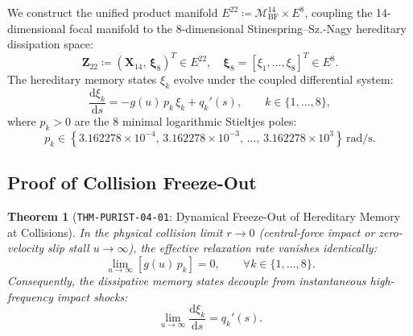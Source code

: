 \documentclass[11pt,a4paper,reqno]{article}
\theoremstyle{plain}
\newtheorem{theorem}{Theorem}[section]
\theoremstyle{definition}
\theoremstyle{remark}
\numberwithin{equation}{section}
\begin{document}
We construct the unified product manifold $E^{22} \coloneqq \mathcal{M}_{\mathrm{BF}}^{14} \times E^8$, coupling the 14-dimensional focal manifold to the 8-dimensional Stinespring--Sz.-Nagy hereditary dissipation space:
\begin{equation}
  \bm{Z}_{22} \coloneqq (\bm{X}_{14}, \, \bm{\xi}_8)^T \in E^{22}, \quad \bm{\xi}_8 = [\xi_1, \dots, \xi_8]^T \in E^8.
\end{equation}
The hereditary memory states $\xi_k$ evolve under the coupled differential system:
\begin{equation}
  \frac{\mathrm{d}\xi_k}{\mathrm{d}s} = - g(u) \, p_k \, \xi_k + q_k'(s), \qquad k \in \{1, \dots, 8\},
  \label{eq:coupled_xi}
\end{equation}
where $p_k > 0$ are the 8 minimal logarithmic Stieltjes poles:
\begin{equation}
  p_k \in \left\{ 3.162278 \times 10^{-4}, \, 3.162278 \times 10^{-3}, \, \dots, \, 3.162278 \times 10^3 \right\} \,\mathrm{rad/s}.
\end{equation}

\subsection{Proof of Collision Freeze-Out}
\begin{theorem}[\texttt{THM-PURIST-04-01}: Dynamical Freeze-Out of Hereditary Memory at Collisions]
\label{thm:collision_freeze_out}
In the physical collision limit $r \to 0$ (central-force impact or zero-velocity slip stall $u \to \infty$), the effective relaxation rate vanishes identically:
\begin{equation}
  \lim_{u \to \infty} \left[ g(u) \, p_k \right] = 0, \qquad \forall k \in \{1, \dots, 8\}.
\end{equation}
Consequently, the dissipative memory states decouple from instantaneous high-frequency impact shocks:
\begin{equation}
  \lim_{u \to \infty} \frac{\mathrm{d}\xi_k}{\mathrm{d}s} = q_k'(s).
\end{equation}
\end{theorem}
\end{document}
